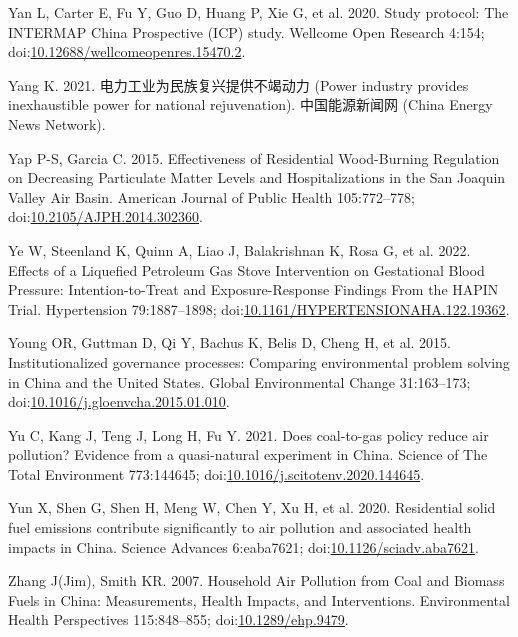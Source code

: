 \documentclass[
  letterpaper,
  DIV=11,
  numbers=noendperiod]{scrartcl}
\newlength{\cslhangindent}
\newenvironment{CSLReferences}[2] %
 {\begin{list}{}{%
  \setlength{\itemindent}{0pt}
  \setlength{\leftmargin}{0pt}
  \setlength{\parsep}{0pt}
  \ifodd #1
   \setlength{\leftmargin}{\cslhangindent}
   \setlength{\itemindent}{-1\cslhangindent}
  \fi
  \setlength{\itemsep}{#2\baselineskip}}}
 {\end{list}}
\begin{document}
\begin{CSLReferences}{1}{1}
Yan L, Carter E, Fu Y, Guo D, Huang P, Xie G, et al. 2020. Study
protocol: {The INTERMAP China Prospective} ({ICP}) study. Wellcome Open
Research 4:154;
doi:\href{https://doi.org/10.12688/wellcomeopenres.15470.2}{10.12688/wellcomeopenres.15470.2}.

Yang K. 2021. {电力工业为民族复兴提供不竭动力 (Power industry provides
inexhaustible power for national rejuvenation)}. 中国能源新闻网 (China
Energy News Network).

Yap P-S, Garcia C. 2015. Effectiveness of {Residential Wood-Burning
Regulation} on {Decreasing Particulate Matter Levels} and
{Hospitalizations} in the {San Joaquin Valley Air Basin}. American
Journal of Public Health 105:772--778;
doi:\href{https://doi.org/10.2105/AJPH.2014.302360}{10.2105/AJPH.2014.302360}.

Ye W, Steenland K, Quinn A, Liao J, Balakrishnan K, Rosa G, et al. 2022.
Effects of a {Liquefied Petroleum Gas Stove Intervention} on
{Gestational Blood Pressure}: {Intention-to-Treat} and
{Exposure-Response Findings From} the {HAPIN Trial}. Hypertension
79:1887--1898;
doi:\href{https://doi.org/10.1161/HYPERTENSIONAHA.122.19362}{10.1161/HYPERTENSIONAHA.122.19362}.

Young OR, Guttman D, Qi Y, Bachus K, Belis D, Cheng H, et al. 2015.
Institutionalized governance processes: {Comparing} environmental
problem solving in {China} and the {United States}. Global Environmental
Change 31:163--173;
doi:\href{https://doi.org/10.1016/j.gloenvcha.2015.01.010}{10.1016/j.gloenvcha.2015.01.010}.

Yu C, Kang J, Teng J, Long H, Fu Y. 2021. Does coal-to-gas policy reduce
air pollution? {Evidence} from a quasi-natural experiment in {China}.
Science of The Total Environment 773:144645;
doi:\href{https://doi.org/10.1016/j.scitotenv.2020.144645}{10.1016/j.scitotenv.2020.144645}.

Yun X, Shen G, Shen H, Meng W, Chen Y, Xu H, et al. 2020. Residential
solid fuel emissions contribute significantly to air pollution and
associated health impacts in {China}. Science Advances 6:eaba7621;
doi:\href{https://doi.org/10.1126/sciadv.aba7621}{10.1126/sciadv.aba7621}.

Zhang J(Jim), Smith KR. 2007. Household {Air Pollution} from {Coal} and
{Biomass Fuels} in {China}: {Measurements}, {Health Impacts}, and
{Interventions}. Environmental Health Perspectives 115:848--855;
doi:\href{https://doi.org/10.1289/ehp.9479}{10.1289/ehp.9479}.


\end{CSLReferences}
\end{document}
